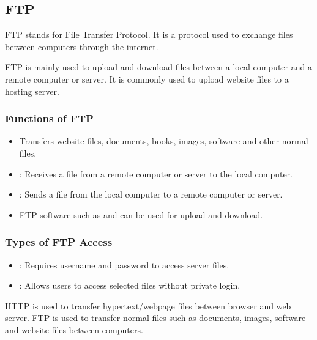\subsection{FTP}

\begin{definitionbox}[FTP]
FTP stands for File Transfer Protocol. It is a protocol used to exchange files between computers through the internet.
\end{definitionbox}

\Note FTP is mainly used to upload and download files between a local computer and a remote computer or server. It is commonly used to upload website files to a hosting server.

\subsubsection{Functions of FTP}

\begin{itemize}
    \item Transfers website files, documents, books, images, software and other normal files.
    \item {}: Receives a file from a remote computer or server to the local computer.
    \item {}: Sends a file from the local computer to a remote computer or server.
    \item FTP software such as  and  can be used for upload and download.
\end{itemize}

\subsubsection{Types of FTP Access}

\begin{itemize}
    \item {}: Requires username and password to access server files.
    \item {}: Allows users to access selected files without private login.
\end{itemize}

\begin{summarybox}
HTTP is used to transfer hypertext/webpage files between browser and web server. FTP is used to transfer normal files such as documents, images, software and website files between computers.
\end{summarybox}

